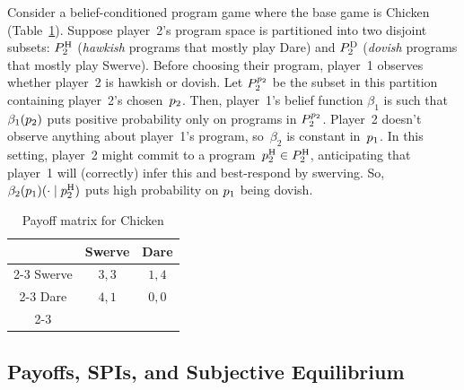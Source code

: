 \documentclass[sigconf]{aamas}
\theoremstyle{definition}
\begin{document}
\begin{example}
Consider a belief-conditioned program game where the base game is Chicken (Table~\ref{tab:chicken}).
Suppose player~2's program space is partitioned into two disjoint subsets: $P_2^{\text{H}}$ (\textit{hawkish} programs that mostly play Dare) and $P_2^{\text{D}}$ (\textit{dovish} programs that mostly play Swerve).
Before choosing their program, player~1 observes whether player~2 is hawkish or dovish.
Let $P_2^{p_2}$ be the subset in this partition containing player~2's chosen~$p_2$.
Then, player~1's belief function $\beta_1$ is such that
$\beta_1(p_2)$ puts positive probability only on programs in $P_2^{p_2}$.
Player~2 doesn't observe anything about player~1's program, so~$\beta_2$ is constant in~$p_1$.
In this setting, player~2 might commit to a program~$p_2^{\text{H}} \in P_2^{\text{H}}$, anticipating that player~1 will (correctly) infer this and best-respond by swerving. So,~$\beta_2(p_1)(\cdot \mid p_2^{\text{H}})$ puts high probability on $p_1$ being dovish.
\label{ex:chicken}
\end{example}

\begin{table}
    \centering
    \caption{Payoff matrix for Chicken}
    \begin{tabular}{c|c|c|}
          \multicolumn{1}{c}{} & \multicolumn{1}{c}{Swerve} & \multicolumn{1}{c}{Dare}\\
     \cline{2-3}
      Swerve & $3, 3$ & $1, 4$ \\
        \cline{2-3}
      Dare & $4, 1$ & $0, 0$ \\
       \cline{2-3}
    \end{tabular}
    \label{tab:chicken}
\end{table}

\subsection{Payoffs, SPIs, and Subjective Equilibrium}\label{sub:outcomes}
\end{document}
